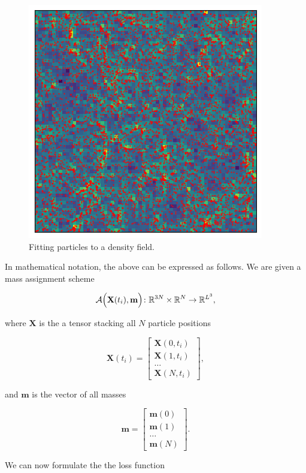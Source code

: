 \documentclass{article}
\begin{document}
{\begin{appendices}
\begin{figure}[h]
    \centering
    \includegraphics[width=0.5\linewidth]{img/fit.png}
    \caption{Fitting particles to a density field.}
    \label{fig:cosmax-fit}
\end{figure}

In mathematical notation, the above can be expressed as follows. We are given a mass assignment scheme 

\begin{equation}
    \mathcal{A}\Bigl(\mathbf{X}(t_i), \mathbf{m}\Bigr) \colon \mathbb{R}^{3N} \times \mathbb{R}^{N} \rightarrow \mathbb{R}^{L^3},
\end{equation}

where $\mathbf{X}$ is the a tensor stacking all $N$ particle positions
 
\begin{equation}
    \mathbf{X}(t_i) = \begin{bmatrix}
        \mathbf{X}(0, t_i) \\
        \mathbf{X}(1, t_i) \\
        \dots  \\
        \mathbf{X}(N, t_i)
    \end{bmatrix},
\end{equation}

and $\mathbf{m}$ is the vector of all masses

\begin{equation}
    \mathbf{m}= \begin{bmatrix}
        \mathbf{m}(0) \\
        \mathbf{m}(1) \\
        \dots  \\
        \mathbf{m}(N)
    \end{bmatrix}.
\end{equation}

We can now formulate the the loss function


\end{appendices}}
\end{document}
